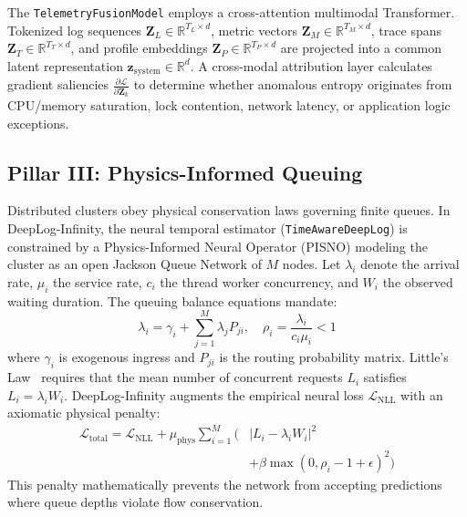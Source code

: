 \documentclass[letterpaper,twocolumn,10pt]{article}
\begin{document}
The \texttt{Telemetry\allowbreak Fusion\allowbreak Model} employs a cross-attention multimodal Transformer. Tokenized log sequences $\mathbf{Z}_L \in \mathbb{R}^{T_L \times d}$, metric vectors $\mathbf{Z}_M \in \mathbb{R}^{T_M \times d}$, trace spans $\mathbf{Z}_T \in \mathbb{R}^{T_T \times d}$, and profile embeddings $\mathbf{Z}_P \in \mathbb{R}^{T_P \times d}$ are projected into a common latent representation $\mathbf{z}_{\text{system}} \in \mathbb{R}^{d}$. A cross-modal attribution layer calculates gradient saliencies $\frac{\partial \mathcal{L}}{\partial \mathbf{Z}_k}$ to determine whether anomalous entropy originates from CPU/memory saturation, lock contention, network latency, or application logic exceptions.

\subsection{Pillar III: Physics-Informed Queuing}
Distributed clusters obey physical conservation laws governing finite queues. In DeepLog-Infinity, the neural temporal estimator (\texttt{TimeAwareDeepLog}) is constrained by a Physics-Informed Neural Operator (PISNO) modeling the cluster as an open Jackson Queue Network of $M$ nodes. Let $\lambda_i$ denote the arrival rate, $\mu_i$ the service rate, $c_i$ the thread worker concurrency, and $W_i$ the observed waiting duration. The queuing balance equations mandate:
\begin{equation}
\label{eq:jackson_balance}
\lambda_i = \gamma_i + \sum_{j=1}^M \lambda_j P_{ji}, \quad \rho_i = \frac{\lambda_i}{c_i \mu_i} < 1
\end{equation}
where $\gamma_i$ is exogenous ingress and $P_{ji}$ is the routing probability matrix. Little's Law~\cite{little1961proof} requires that the mean number of concurrent requests $L_i$ satisfies $L_i = \lambda_i W_i$. DeepLog-Infinity augments the empirical neural loss $\mathcal{L}_{\text{NLL}}$ with an axiomatic physical penalty:
\begin{equation}
\label{eq:physics_loss}
\begin{split}
\mathcal{L}_{\text{total}} = \mathcal{L}_{\text{NLL}} + \mu_{\text{phys}} \sum_{i=1}^M \Big( &|L_i - \lambda_i W_i|^2 \\
&+ \beta \max(0, \rho_i - 1 + \epsilon)^2 \Big)
\end{split}
\end{equation}
This penalty mathematically prevents the network from accepting predictions where queue depths violate flow conservation.
\end{document}

